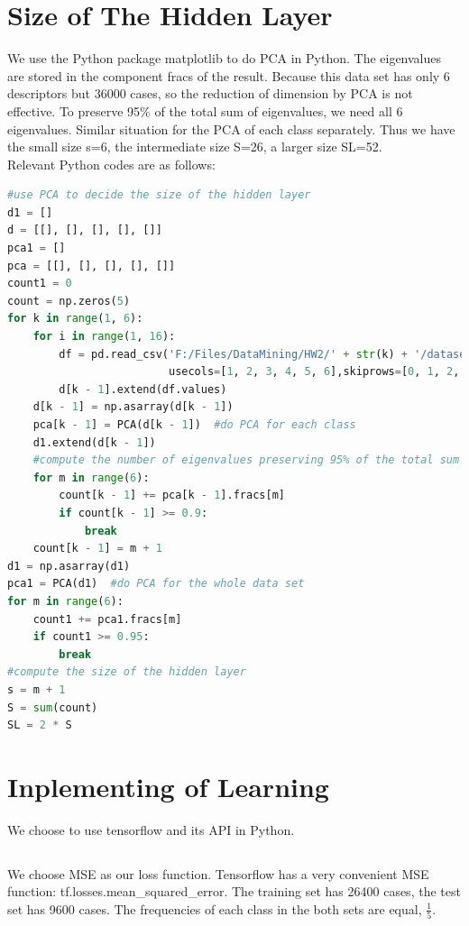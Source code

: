 \documentclass{article}
\begin{document}
\section{Size of The Hidden Layer}
We use the Python package matplotlib to do PCA in Python. The eigenvalues are stored in the component fracs of the result. Because this data set has only 6 descriptors but 36000 cases, so the reduction of dimension by PCA is not effective. To preserve 95\% of the total sum of eigenvalues, we need all 6 eigenvalues. Similar situation for the PCA of each class separately. Thus we have the small size s=6, the intermediate size S=26, a larger size SL=52.\\
Relevant Python codes are as follows:
\begin{lstlisting}[language=Python]
#use PCA to decide the size of the hidden layer
d1 = []
d = [[], [], [], [], []]
pca1 = []
pca = [[], [], [], [], []]
count1 = 0
count = np.zeros(5)
for k in range(1, 6):
    for i in range(1, 16):
        df = pd.read_csv('F:/Files/DataMining/HW2/' + str(k) + '/dataset' + str(i) + '.csv',
                         usecols=[1, 2, 3, 4, 5, 6],skiprows=[0, 1, 2, 3, 4], header=None)
        d[k - 1].extend(df.values)
    d[k - 1] = np.asarray(d[k - 1])
    pca[k - 1] = PCA(d[k - 1])  #do PCA for each class
    d1.extend(d[k - 1])
    #compute the number of eigenvalues preserving 95% of the total sum of eigenvalues
    for m in range(6):
        count[k - 1] += pca[k - 1].fracs[m]
        if count[k - 1] >= 0.9:
            break
    count[k - 1] = m + 1
d1 = np.asarray(d1)
pca1 = PCA(d1)  #do PCA for the whole data set
for m in range(6):
    count1 += pca1.fracs[m]
    if count1 >= 0.95:
        break
#compute the size of the hidden layer
s = m + 1
S = sum(count)
SL = 2 * S
\end{lstlisting}
\section{Inplementing of Learning}
We choose to use tensorflow and its API in Python.
\subsection{}We choose MSE as our loss function. Tensorflow has a very convenient MSE function: tf.losses.mean\_squared\_error. The training set has 26400 cases, the test set has 9600 cases. The frequencies of each class in the both sets are equal, $\frac{1}{5}$.
\end{document}
